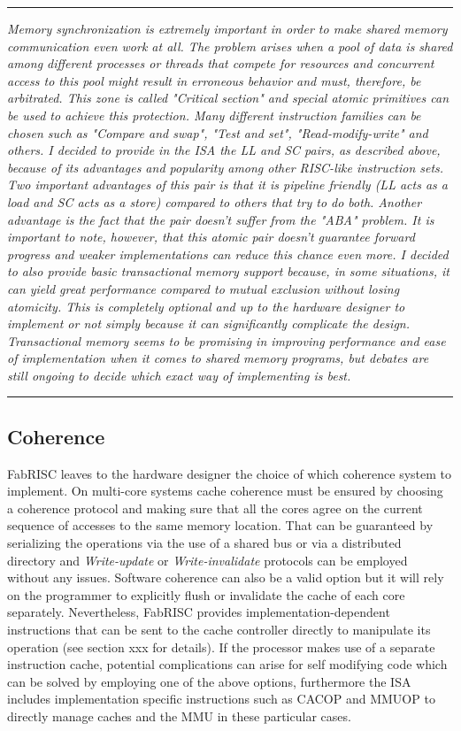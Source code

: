 \documentclass{article}
\begin{document}
        \par\noindent\rule{\textwidth}{0.4pt}
        \textit{Memory synchronization is extremely important in order to make shared memory communication even work at all. The problem arises when a pool of data is shared among different processes or threads that compete for resources and concurrent access to this pool might result in erroneous behavior and must, therefore, be arbitrated. This zone is called "Critical section" and special atomic primitives can be used to achieve this protection. Many different instruction families can be chosen such as "Compare and swap", "Test and set", "Read-modify-write" and others. I decided to provide in the ISA the LL and SC pairs, as described above, because of its advantages and popularity among other RISC-like instruction sets. Two important advantages of this pair is that it is pipeline friendly (LL acts as a load and SC acts as a store) compared to others that try to do both. Another advantage is the fact that the pair doesn't suffer from the "ABA" problem. It is important to note, however, that this atomic pair doesn't guarantee forward progress and weaker implementations can reduce this chance even more. I decided to also provide basic transactional memory support because, in some situations, it can yield great performance compared to mutual exclusion without losing atomicity. This is completely optional and up to the hardware designer to implement or not simply because it can significantly complicate the design. Transactional memory seems to be promising in improving performance and ease of implementation when it comes to shared memory programs, but debates are still ongoing to decide which exact way of implementing is best.}
        \par\noindent\rule{\textwidth}{0.4pt}

        \subsection{Coherence}

            FabRISC leaves to the hardware designer the choice of which coherence system to implement. On multi-core systems cache coherence must be ensured by choosing a coherence protocol and making sure that all the cores agree on the current sequence of accesses to the same memory location. That can be guaranteed by serializing the operations via the use of a shared bus or via a distributed directory and \textit{Write-update} or \textit{Write-invalidate} protocols can be employed without any issues. Software coherence can also be a valid option but it will rely on the programmer to explicitly flush or invalidate the cache of each core separately. Nevertheless, FabRISC provides implementation-dependent instructions that can be sent to the cache controller directly to manipulate its operation (see section xxx for details). If the processor makes use of a separate instruction cache, potential complications can arise for self modifying code which can be solved by employing one of the above options, furthermore the ISA includes implementation specific instructions such as CACOP and MMUOP to directly manage caches and the MMU in these particular cases.
\end{document}
